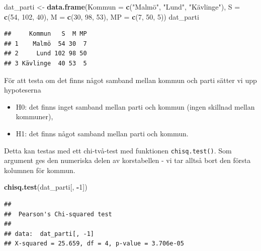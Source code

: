 \documentclass[
]{book}
\newenvironment{Shaded}{\begin{snugshade}}{\end{snugshade}}
\newcommand{\AttributeTok}[1]{\textcolor[rgb]{0.13,0.29,0.53}{#1}}
\newcommand{\DecValTok}[1]{\textcolor[rgb]{0.00,0.00,0.81}{#1}}
\newcommand{\FunctionTok}[1]{\textcolor[rgb]{0.13,0.29,0.53}{\textbf{#1}}}
\newcommand{\NormalTok}[1]{#1}
\newcommand{\OtherTok}[1]{\textcolor[rgb]{0.56,0.35,0.01}{#1}}
\newcommand{\SpecialCharTok}[1]{\textcolor[rgb]{0.81,0.36,0.00}{\textbf{#1}}}
\newcommand{\StringTok}[1]{\textcolor[rgb]{0.31,0.60,0.02}{#1}}
\providecommand{\tightlist}{%
  \setlength{\itemsep}{0pt}\setlength{\parskip}{0pt}}
\theoremstyle{definition}
\theoremstyle{definition}
\theoremstyle{definition}
\theoremstyle{definition}
\theoremstyle{remark}
\begin{document}
\begin{Shaded}
\begin{Highlighting}[]
\NormalTok{dat\_parti }\OtherTok{\textless{}{-}} \FunctionTok{data.frame}\NormalTok{(}\AttributeTok{Kommun =} \FunctionTok{c}\NormalTok{(}\StringTok{"Malmö"}\NormalTok{, }\StringTok{"Lund"}\NormalTok{, }\StringTok{"Kävlinge"}\NormalTok{),}
                        \AttributeTok{S =} \FunctionTok{c}\NormalTok{(}\DecValTok{54}\NormalTok{, }\DecValTok{102}\NormalTok{, }\DecValTok{40}\NormalTok{),}
                        \AttributeTok{M =} \FunctionTok{c}\NormalTok{(}\DecValTok{30}\NormalTok{, }\DecValTok{98}\NormalTok{, }\DecValTok{53}\NormalTok{),}
                        \AttributeTok{MP =} \FunctionTok{c}\NormalTok{(}\DecValTok{7}\NormalTok{, }\DecValTok{50}\NormalTok{, }\DecValTok{5}\NormalTok{))}
\NormalTok{dat\_parti}
\end{Highlighting}
\end{Shaded}

\begin{verbatim}
##     Kommun   S  M MP
## 1    Malmö  54 30  7
## 2     Lund 102 98 50
## 3 Kävlinge  40 53  5
\end{verbatim}

För att testa om det finns något samband mellan kommun och parti sätter vi upp hypoteserna

\begin{itemize}
\tightlist
\item
  H0: det finns inget samband mellan parti och kommun (ingen skillnad mellan kommuner),
\item
  H1: det finns något samband mellan parti och kommun.
\end{itemize}

Detta kan testas med ett chi-två-test med funktionen \texttt{chisq.test()}. Som argument ges den numeriska delen av korstabellen - vi tar alltså bort den första kolumnen för kommun.

\begin{Shaded}
\begin{Highlighting}[]
\FunctionTok{chisq.test}\NormalTok{(dat\_parti[, }\SpecialCharTok{{-}}\DecValTok{1}\NormalTok{])}
\end{Highlighting}
\end{Shaded}

\begin{verbatim}
## 
##  Pearson's Chi-squared test
## 
## data:  dat_parti[, -1]
## X-squared = 25.659, df = 4, p-value = 3.706e-05
\end{verbatim}
\end{document}
